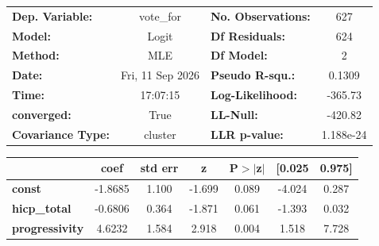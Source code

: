 \begin{center}
\begin{tabular}{lclc}
\toprule
\textbf{Dep. Variable:}   &    vote\_for     & \textbf{  No. Observations:  } &      627    \\
\textbf{Model:}           &      Logit       & \textbf{  Df Residuals:      } &      624    \\
\textbf{Method:}          &       MLE        & \textbf{  Df Model:          } &        2    \\
\textbf{Date:}            & Fri, 11 Sep 2026 & \textbf{  Pseudo R-squ.:     } &   0.1309    \\
\textbf{Time:}            &     17:07:15     & \textbf{  Log-Likelihood:    } &   -365.73   \\
\textbf{converged:}       &       True       & \textbf{  LL-Null:           } &   -420.82   \\
\textbf{Covariance Type:} &     cluster      & \textbf{  LLR p-value:       } & 1.188e-24   \\
\bottomrule
\end{tabular}
\begin{tabular}{lcccccc}
                       & \textbf{coef} & \textbf{std err} & \textbf{z} & \textbf{P$> |$z$|$} & \textbf{[0.025} & \textbf{0.975]}  \\
\midrule
\textbf{const}         &      -1.8685  &        1.100     &    -1.699  &         0.089        &       -4.024    &        0.287     \\
\textbf{hicp\_total}   &      -0.6806  &        0.364     &    -1.871  &         0.061        &       -1.393    &        0.032     \\
\textbf{progressivity} &       4.6232  &        1.584     &     2.918  &         0.004        &        1.518    &        7.728     \\
\bottomrule
\end{tabular}
\end{center}